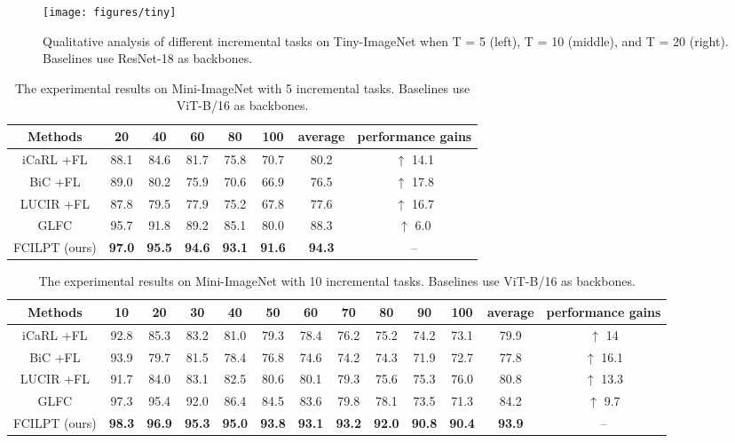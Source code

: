 \documentclass[sigconf,anonymous,review,screen]{acmart}
\begin{document}
\begin{figure}
	\centering
	\texttt{[image: figures/tiny]}
	\caption{Qualitative analysis of different incremental tasks on Tiny-ImageNet when T = 5 (left), T = 10 (middle), and T = 20 (right). Baselines use ResNet-18 as backbones.}
	\label{common_figure_tiny}
\end{figure}



\begin{table*}[t]\footnotesize
	\centering
	\caption{The experimental results on Mini-ImageNet with 5 incremental tasks. Baselines use ViT-B/16 as backbones.}
	\label{tab:7}{
		\begin{tabular}{cccccccc}
			\toprule
			Methods & 20 & 40 & 60 & 80 & 100 &average & performance gains \\
			\midrule
			iCaRL \cite{rebuffi2017icarl}+FL  & 88.1 & 84.6 & 81.7 & 75.8 & 70.7 & 80.2 & $\uparrow$ 14.1  \\
			BiC \cite{wu2019large}+FL & 89.0 & 80.2 & 75.9 & 70.6 & 66.9 & 76.5 & $\uparrow$ 17.8 \\
			LUCIR \cite{hou2019learning}+FL & 87.8 & 79.5 & 77.9 & 75.2 & 67.8 & 77.6 & $\uparrow$ 16.7 \\
			GLFC \cite{dong2022federated} & 95.7 & 91.8 & 89.2 & 85.1 & 80.0 & 88.3 & $\uparrow$ 6.0 \\
			FCILPT (ours) & \textbf{97.0} & \textbf{95.5} & \textbf{94.6} & \textbf{93.1} & \textbf{91.6} & \textbf{94.3} & -- \\
			\bottomrule
	\end{tabular}	}
\end{table*}

\begin{table*}[t]\footnotesize
	\centering
	\caption{The experimental results on Mini-ImageNet with 10 incremental tasks. Baselines use ViT-B/16 as backbones.}
	\label{tab:8}{
		\begin{tabular}{ccccccccccccc}
			\toprule
			Methods & 10 & 20 & 30 & 40 & 50 & 60 & 70 & 80 & 90 & 100 & average & performance gains \\
			\midrule
			iCaRL \cite{rebuffi2017icarl}+FL  & 92.8 & 85.3 & 83.2 & 81.0 & 79.3 & 78.4 & 76.2 & 75.2 & 74.2 & 73.1 & 79.9 & $\uparrow$ 14  \\
			BiC \cite{wu2019large}+FL & 93.9 & 79.7 & 81.5 & 78.4 & 76.8 & 74.6 & 74.2 & 74.3 & 71.9 & 72.7 & 77.8 & $\uparrow$ 16.1 \\
			LUCIR \cite{hou2019learning}+FL & 91.7 & 84.0 & 83.1 & 82.5 & 80.6 & 80.1 & 79.3 & 75.6 & 75.3 & 76.0 & 80.8 & $\uparrow$ 13.3 \\
			GLFC \cite{dong2022federated} & 97.3 & 95.4 & 92.0 & 86.4 & 84.5 & 83.6 & 79.8 & 78.1 & 73.5 & 71.3 & 84.2 & $\uparrow$ 9.7 \\
			FCILPT (ours) & \textbf{98.3} & \textbf{96.9} & \textbf{95.3} & \textbf{95.0} & \textbf{93.8} & \textbf{93.1} & \textbf{93.2} & \textbf{92.0} & \textbf{90.8} & \textbf{90.4} & \textbf{93.9} & -- \\
			\bottomrule
	\end{tabular}	}
\end{table*}
\end{document}
